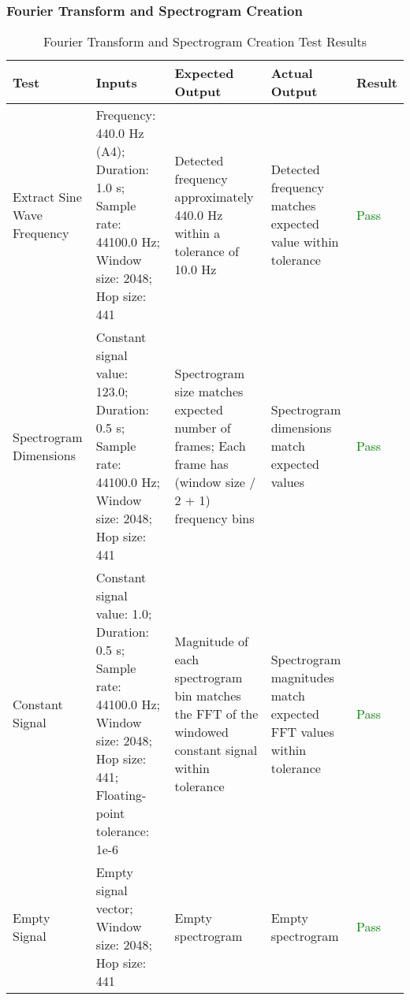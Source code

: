 \documentclass[12pt, titlepage]{article}
\begin{document}
\subsubsection{Fourier Transform and Spectrogram Creation}
\begin{longtable}{|L{3cm}|L{3cm}|L{2.5cm}|L{2.5cm}|l|}
  \caption{Fourier Transform and Spectrogram Creation Test Results} \\
  \hline
  \textbf{Test} & \textbf{Inputs} & \textbf{Expected Output} & \textbf{Actual Output} & \textbf{Result} \\
  \hline
  Extract Sine Wave Frequency &
    Frequency: 440.0 Hz (A4); \newline
    Duration: 1.0 s; \newline
    Sample rate: 44100.0 Hz; \newline
    Window size: 2048; \newline
    Hop size: 441 &
    Detected frequency approximately 440.0 Hz within a tolerance of 10.0 Hz &
    Detected frequency matches expected value within tolerance &
    \textcolor{green}{Pass} \\
  \hline

  Spectrogram Dimensions &
    Constant signal value: 123.0; \newline
    Duration: 0.5 s; \newline
    Sample rate: 44100.0 Hz; \newline
    Window size: 2048; \newline
    Hop size: 441 &
    Spectrogram size matches expected number of frames; \newline
    Each frame has (window size / 2 + 1) frequency bins &
    Spectrogram dimensions match expected values &
    \textcolor{green}{Pass} \\
  \hline

  Constant Signal &
    Constant signal value: 1.0; \newline
    Duration: 0.5 s; \newline
    Sample rate: 44100.0 Hz; \newline
    Window size: 2048; \newline
    Hop size: 441; \newline
    Floating-point tolerance: 1e-6 &
    Magnitude of each spectrogram bin matches the FFT of the windowed constant signal within tolerance &
    Spectrogram magnitudes match expected FFT values within tolerance &
    \textcolor{green}{Pass} \\
  \hline

  Empty Signal &
    Empty signal vector; \newline
    Window size: 2048; \newline
    Hop size: 441 &
    Empty spectrogram &
    Empty spectrogram &
    \textcolor{green}{Pass} \\
  \hline
\end{longtable}
\end{document}
